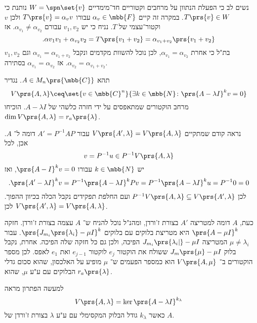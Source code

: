 \documentclass[article, 10pt,oneside]{article}
\begin{document}
\begin{solution}
נשים לב כי הפעלת הנתוון על מרחבים וקטוריים חד־מימדיים
$W = \spn\set{v}$
נותנת כי
$T\prs{v} \in W$.
במקרה זה קיים
$\alpha_v \in \mbb{F}$
עבורו
$T\prs{v} = \alpha_v v$
ולכן
$v$
וקטור־עצמי של
$T$.
נניח כי יש
$v_1, v_2$
עבורם
$\alpha_{v_1} \neq \alpha_{v_2}$.
אז
\[\text{.} \alpha{v_1} v_1 + \alpha_{v_2} v_2 = T\prs{v_1 + v_2} = \alpha_{v_1 + v_2} \prs{v_1 + v_2}\]
$v_1,v_2$
בת"ל כי אחרת
$\alpha_{v_1} = \alpha_{v_2}$,
לכן נוכל להשוות מקדמים ונקבל
$\alpha_{v_1} = \alpha_{v_1 + v_2}$
וגם
$\alpha_{v_2} = \alpha_{v_1 + v_2}$.
אז
$\alpha_{v_1} = \alpha_{v_2}$
בסתירה.
\end{solution}

\begin{exercise}
תהא
$A \in M_n\prs{\mbb{C}}$.
נגדיר
\[V\prs{A, \lambda} \ceq \set{v \in \mbb{C}^n}{\exists k \in \mbb{N} \colon \prs{A- \lambda I}^k v = 0}\]
מרחב הוקטורים שמתאפסים על ידי חזרה כלשהי של
$A - \lambda I$.
הוכיחו
$\dim V\prs{A, \lambda} = r_a\prs{\lambda}$.
\end{exercise}

\begin{solution}
נראה קודם שמתקיים
$V\prs{A', \lambda} = V\prs{A, \lambda}$
עבור
$A' = P^{-1} A P$
דומה ל־%
$A$.
אכן, לכל
\[v = P^{-1} u \in P^{-1} V\prs{A,\lambda}\]
יש
$k \in \mbb{N}$
עבורו
$\prs{A-I}^k v = 0$,
ואז
\[\text{.} \prs{A' - \lambda I}^k v = P^{-1} \prs{A - \lambda I}^k P v = P^{-1} \prs{A-\lambda I}^k u = P^{-1} 0 = 0\]
לכן
$P^{-1} V\prs{A,\lambda} \subseteq V\prs{A', \lambda}$
ועם החלפת תפקידים נקבל הכלה בכיוון ההפוך.
לכן
$V\prs{A', \lambda} = V\prs{A, \lambda}$.

כעת,
$A$
דומה למטריצה
$A'$
בצורת ז'ורדן, ומהנ"ל נוכל להניח ש־%
$A$
עצמה בצורת ז'ורדן.
חזקה
$\prs{A - \mu I}^k$
היא מטריצת בלוקים עם בלוקים
$\prs{J_{m_i}\prs{\lambda_i} - \mu I}^k$.
עבור
$\mu \neq \lambda_i$
המטריצה
$J_{m_i}\prs{\lambda_i|} - \mu I$
הפיכה, ולכן גם כל חזקה שלה הפיכה.
אחרת, נקבל בלוק
$J_m\prs{\mu} - \mu I$
ששולח את הוקטור
$e_j$
לוקטור
$e_{j-1}$
ואת
$e_1$
לאפס.
לכן מספר הוקטורים ב־%
$V\prs{A, \mu}$
הוא כמספר הפעמים ש־%
$\mu$
מופיע על האלכסון, שהוא סכום גדלי הבלוקים עם ע"ע
$\mu$,
שהוא
$r_a\prs{\lambda}$.
\end{solution}

\begin{remark}
למעשה הפתרון מראה
\[V\prs{A, \lambda} = \ker\prs{A - \lambda I}^{k_\lambda}\]
כאשר
$k_\lambda$
גודל הבלוק המקסימלי עם ע"ע
$\lambda$
בצורת ז'ורדן של
$A$.
\end{remark}
\end{document}
